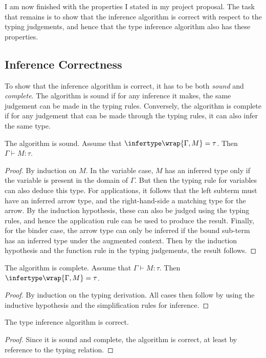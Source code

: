 I am now finished with the properties I stated in my project proposal.
The task that remains is to show that the inference algorithm is correct with respect to the typing judgements, and hence that the type inference algorithm also has these properties.

\subsection{Inference Correctness}
To show that the inference algorithm is correct, it has to be both \emph{sound} and \emph{complete}.
The algorithm is sound if for any inference it makes, the same judgement can be made in the typing rules.
Conversely, the algorithm is complete if for any judgement that can be made through the typing rules, it can also infer the same type.

\begin{lemma}
The algorithm is sound.
Assume that \(\infertype\wrap{\Gamma, M} = \tau\).
Then \(\Gamma \vdash M : \tau\).
\end{lemma}
\begin{proof}
By induction on \(M\).
In the variable case, \(M\) has an inferred type only if the variable is present in the domain of \(\Gamma\).
But then the typing rule for variables can also deduce this type.
For applications, it follows that the left subterm must have an inferred arrow type, and the right-hand-side a matching type for the arrow.
By the induction hypothesis, these can also be judged using the typing rules, and hence the application rule can be used to produce the result.
Finally, for the binder case, the arrow type can only be inferred if the bound sub-term has an inferred type under the augmented context.
Then by the induction hypothesis and the function rule in the typing judgements, the result follows.
\end{proof}

\begin{lemma}
The algorithm is complete.
Assume that \(\Gamma \vdash M : \tau\).
Then \(\infertype\wrap{\Gamma, M} = \tau\).
\end{lemma}
\begin{proof}
By induction on the typing derivation.
All cases then follow by using the inductive hypothesis and the simplification rules for inference.
\end{proof}

\begin{theorem}
The type inference algorithm is correct.
\end{theorem}
\begin{proof}
Since it is sound and complete, the algorithm is correct, at least by reference to the typing relation.
\end{proof}

